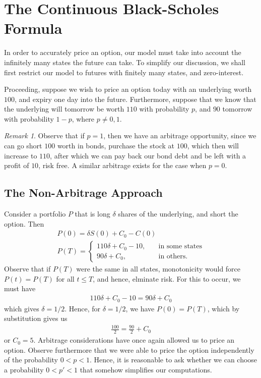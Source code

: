 \documentclass[12pt]{article}
\theoremstyle{plain}
\theoremstyle{definition}
\theoremstyle{remark}
\newtheorem*{remark}{Remark}
\numberwithin{equation}{section}  %
\begin{document}
\section{The Continuous Black-Scholes Formula}
In order to accurately price an option, our model must take into account the
infinitely many states the future can take. To simplify our discussion, we shall
first restrict our model to futures with finitely many states, and
zero-interest. 

Proceeding, suppose we wish to price an option today with an underlying worth
$100$, and expiry one day into the future. Furthermore, suppose that we know
that the underlying will tomorrow be worth $110$ with probability $p$, and $90$
tomorrow with probability $1-p$, where $p \neq 0,1$. 
\begin{remark}
	Observe that if $p=1$, then we have an arbitrage opportunity, since
	we can go short $100$ worth in bonds, purchase the stock at $100$, which then will increase to $110$, after which we can pay back our bond debt and be left with 
	a profit of $10$, risk free. A similar arbitrage exists for the case when $p=0$.
\end{remark}
\subsection{The Non-Arbitrage Approach}
Consider a portfolio $P$
that is long $\delta$ shares of the underlying, and short the option.
Then
\begin{gather*}
		P(0)  = \delta S(0) + C_{0} - C(0)
		\\
		 P(T)  = \begin{cases}
		110 \delta + C_{0} - 10, \quad & \text{in some states}
		\\
		90 \delta + C_{0}, \quad & \text{in others}.
	\end{cases}
	\end{gather*}
	Observe that if $P(T)$ were the same in all states, monotonicity would force
	$P(t) = P(T)$ for all $t \le T$, and hence, elminate risk. For this to occur,
	we must have
	\begin{equation*}
		\begin{split}
			110 \delta + C_{0} - 10 = 90 \delta + C_{0}
		\end{split}
	\end{equation*}
	which gives $\delta = 1/2$. Hence, for $\delta = 1/2$, we have
	$P(0) = P(T)$, which by substitution gives us
	\begin{equation*}
		\begin{split}
			\frac{100}{2} = \frac{90}{2} + C_{0}
		\end{split}
	\end{equation*}
	or $C_{0} = 5$. Arbitrage considerations have once again
	allowed us to price an option. Observe furthermore that we were able
	to price the option independently of the probability $0 < p < 1$. 
	Hence, it is reasonable to ask whether we can choose a probability
	$0 < p' < 1$ that somehow simplifies our computations.
\end{document}
